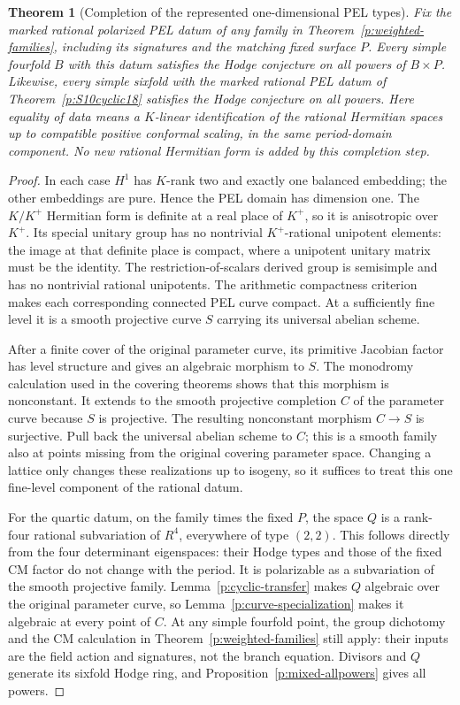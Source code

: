 \documentclass[11pt,reqno]{article}
\theoremstyle{emphasizedplain}
\newtheorem{theorem}{Theorem}[section]
\theoremstyle{emphasizeddefinition}
\theoremstyle{emphasizeddefinition}
\begin{document}
\begin{theorem}[Completion of the represented one-dimensional PEL types]
\label{p:PELcompletion}
Fix the marked rational polarized PEL datum of any family in
Theorem~\ref{p:weighted-families}, including its signatures and the
matching fixed surface $P$. Every simple fourfold $B$ with this datum
satisfies the Hodge conjecture on all powers of $B\times P$.
Likewise, every simple sixfold with the marked rational PEL datum of
Theorem~\ref{p:S10cyclic18} satisfies the Hodge conjecture on all powers.
Here equality of data means a $K$-linear identification of the rational
Hermitian spaces up to compatible positive conformal scaling, in the
same period-domain component. No new rational Hermitian form is added
by this completion step.
\end{theorem}
\begin{proof}
In each case $H^1$ has $K$-rank two and exactly one balanced embedding;
the other embeddings are pure. Hence the PEL domain has dimension one.
The $K/K^+$ Hermitian form is definite at a real place of $K^+$, so
it is anisotropic over $K^+$. Its special unitary group has no nontrivial
$K^+$-rational unipotent elements: the image at that definite place is
compact, where a unipotent unitary matrix must be the identity.
The restriction-of-scalars derived group is semisimple and has no
nontrivial rational unipotents. The arithmetic compactness criterion
\cite[Theorem 3.3(b)]{MilneShimura} makes each corresponding connected
PEL curve compact. At a sufficiently fine level it is a smooth
projective curve $S$ carrying its universal abelian scheme.

After a finite cover of the original parameter curve, its primitive
Jacobian factor has level structure and gives an algebraic morphism
to $S$. The monodromy calculation used in the covering theorems shows
that this morphism is nonconstant. It extends to the smooth projective
completion $C$ of the parameter curve because $S$ is projective.
The resulting nonconstant morphism $C\to S$ is surjective. Pull back
the universal abelian scheme to $C$; this is a smooth family also at
points missing from the original covering parameter space.
Changing a lattice only changes these realizations up to isogeny,
so it suffices to treat this one fine-level component of the rational
datum.

For the quartic datum, on the family times the fixed $P$, the space
$Q$ is a rank-four rational subvariation of $R^4$, everywhere of type
$(2,2)$. This follows directly from the four determinant eigenspaces:
their Hodge types and those of the fixed CM factor do not change with
the period. It is polarizable as a subvariation of the smooth projective
family. Lemma~\ref{p:cyclic-transfer} makes $Q$ algebraic over the
original parameter curve, so Lemma~\ref{p:curve-specialization} makes
it algebraic at every point of $C$. At any simple fourfold point,
the group dichotomy and the CM calculation in
Theorem~\ref{p:weighted-families} still apply: their inputs are the
field action and signatures, not the branch equation. Divisors and
$Q$ generate its sixfold Hodge ring, and
Proposition~\ref{p:mixed-allpowers} gives all powers.


\end{proof}
\end{document}
